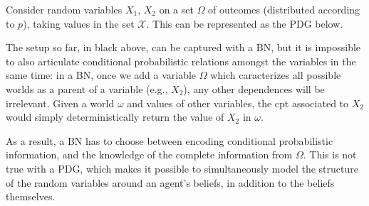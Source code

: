 \documentclass{article}
\numberwithin{equation}{section}
\begin{document}
	\begin{example}\label{ex:randomvars}
		Consider random variables $X_1$, $X_2$  on a set
                $\Omega$ of outcomes (distributed according to $p$),
                taking values in the set $\mathcal X$. This can be
                represented as the PDG below. 
		\begin{center}
		\end{center}
		The setup so far, in black above, can be captured with a BN, but it is impossible to also articulate conditional probabilistic relations amongst the variables in the same time: in a BN, once we add a variable $\Omega$ which caracterizes all possible worlds as a parent of a variable (e.g., $X_2$), any other dependences will be irrelevant. Given a world $\omega$ and values of other variables, the cpt associated to $X_2$ would simply deterministically return the value of $X_2$ in $\omega$. 
		
		As a result, a BN has to choose between encoding conditional probabilistic information, and the knowledge of the complete information from $\Omega$. This is not true with a PDG, which makes it possible to simultaneously model the structure of the random variables around an agent's beliefs, in addition to the beliefs themselves.
	\end{example}
\end{document}
